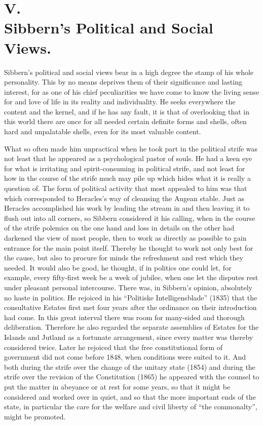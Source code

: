 \documentclass[12pt,a4paper,openany]{book}
\newcommand{\opage}[1]{\marginnote{\footnotesize\textit{[#1]}}}
\begin{document}
\section*{V.\\  Sibbern's Political and Social Views.}

Sibbern's political and social views bear in a high degree
the stamp of his whole personality. This by no means deprives them
of their significance and lasting interest, for as one of
his chief peculiarities we have come to know the
living sense for and love of life in its reality
and individuality. He seeks everywhere the content and the kernel,
and if he has any fault, it is that of overlooking that in
this world there are once for all needed certain definite forms
and shells, often hard and unpalatable shells, even for its
most valuable content.

What so often made him unpractical when he
took part in the political strife was not least that he
appeared as a psychological pastor of souls. He had a keen
eye for what is irritating and spirit-consuming in political
strife, and not least for how in the course of the strife
much may pile up which hides what it is really
a question of. The form of political activity that most
appealed to him was that which corresponded to Heracles's way of
cleansing the Augean stable. Just as Heracles accomplished his
work by leading the stream in and then leaving it to
flush out into all corners, so Sibbern considered it his
calling, when in the course of the strife polemics on the one hand and
loss in details on the other had darkened the view of most people, then
to work as directly as possible to gain entrance for the
main point itself. Thereby he thought to work not only
best for the cause, but also to procure for minds the refreshment
and rest which they needed. It would also be good, he thought,
if in politics one could let, for example, every
fifty-first week be a week of jubilee, when one let the disputes
\opage{99}rest under pleasant personal intercourse. There was, in
Sibbern's opinion, absolutely no haste in politics. He
rejoiced in his ``Politiske Intelligensblade'' (1835) that
the consultative Estates first met four years
after the ordinance on their introduction had come. In
this great interval there was room for many-sided and
thorough deliberation. Therefore he also regarded the
separate assemblies of Estates for the Islands and Jutland as a
fortunate arrangement, since every matter was thereby considered twice.
Later he rejoiced that the free
constitutional form of government did not come before 1848, when conditions were suited
to it. And both during the strife over the
change of the unitary state (1854) and during the strife over the revision of the
Constitution (1865) he appeared with the counsel to put the matter in abeyance
or at rest for some years, so that it might be considered and
worked over in quiet, and so that the more important ends of the state, in particular
the care for the welfare and civil liberty of ``the commonalty'',
might be promoted.
\end{document}
